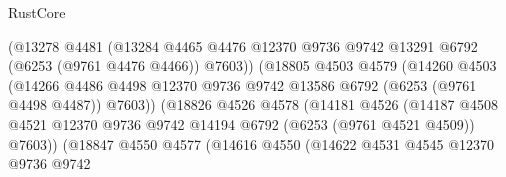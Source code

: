 \begin{lexlean}{RustCore}
\begin{coremodule}
                                    (@13278
                                      @4481
                                      (@13284
                                        @4465
                                        @4476
                                        @12370
                                        @9736
                                        @9742
                                        @13291
                                        @6792
                                        (@6253 (@9761 @4476 @4466))
                                        @7603))
                                    (@18805
                                      @4503
                                      @4579
                                      (@14260
                                        @4503
                                        (@14266
                                          @4486
                                          @4498
                                          @12370
                                          @9736
                                          @9742
                                          @13586
                                          @6792
                                          (@6253 (@9761 @4498 @4487))
                                          @7603))
                                      (@18826
                                        @4526
                                        @4578
                                        (@14181
                                          @4526
                                          (@14187
                                            @4508
                                            @4521
                                            @12370
                                            @9736
                                            @9742
                                            @14194
                                            @6792
                                            (@6253 (@9761 @4521 @4509))
                                            @7603))
                                        (@18847
                                          @4550
                                          @4577
                                          (@14616
                                            @4550
                                            (@14622
                                              @4531
                                              @4545
                                              @12370
                                              @9736
                                              @9742

\end{coremodule}
\end{lexlean}
